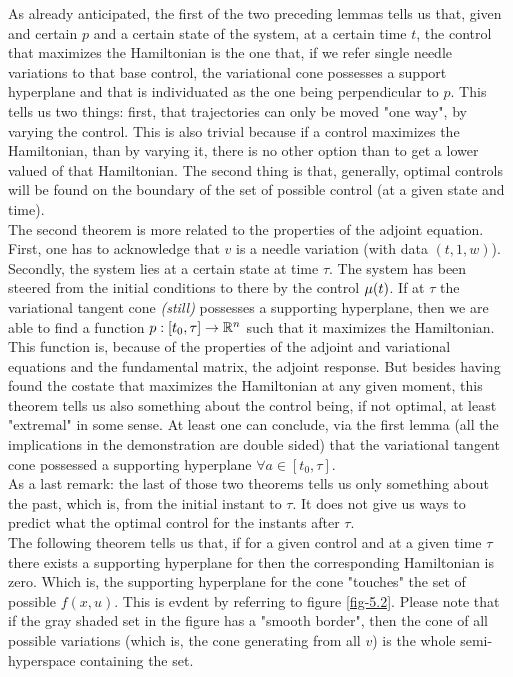 As already anticipated, the first of the two preceding lemmas tells us that, given and certain $p$ and a certain state of the system, at a certain time $t$, the control that maximizes the Hamiltonian is the one that, if we refer single needle variations to that base control, the variational cone  possesses a support hyperplane and that is individuated as the one being perpendicular to $p$. This tells us two things: first, that trajectories can only be moved "one way", by varying the control. This is also trivial because if a control maximizes the Hamiltonian, than by varying it, there is no other option than to get a lower valued of that Hamiltonian. The second thing is that, generally, optimal controls will be found on the boundary of the set of possible control (at a given state and time).\\
The second theorem is more related to the properties of the adjoint equation. First, one has to acknowledge that $v$ is a needle variation (with data $(t,1,w)$). Secondly,  the system lies at a certain state at time $\tau$. The system has been steered from the initial conditions to there by the control $\mu(t)$. If at $\tau$ the variational tangent cone \textit{(still) }possesses a supporting hyperplane, then we are able to find a function $p:[t_0,\tau]\rightarrow\mathbb{R}^n$ such that it maximizes the Hamiltonian. This function is, because of the properties of the adjoint and variational equations and the fundamental matrix, the adjoint response. But besides having found the costate that maximizes the Hamiltonian at any given moment, this theorem tells us also something about the control being, if not optimal, at least "extremal" in some sense. At least one can conclude, via the first lemma (all the implications in the demonstration are double sided) that the variational tangent cone  possessed a supporting hyperplane $\forall a\in[t_0,\tau]$.\\
As a last remark: the last of those two theorems tells us only something about the past, which is, from the initial instant to $\tau$. It does not give us ways to predict what the optimal control for the instants after $\tau$.\\
The following theorem tells us that, if for a given control and at a given time $\tau$ there exists a supporting hyperplane for \fixIntTanCone{\tau} then the corresponding Hamiltonian is zero. Which is, the supporting hyperplane for the cone "touches" the set of possible $f(x,u)$. This is evdent by referring to figure \ref{fig-5.2}. Please note that if the gray shaded set in the figure has a "smooth border", then the cone of all possible variations (which is, the cone generating from all $v$) is the whole semi-hyperspace containing the set. 

